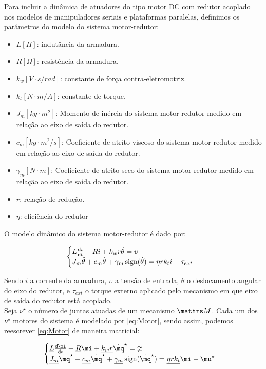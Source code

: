 \documentclass[a4paper,11pt,brazil,fleqn]{article}
\begin{document}
Para incluir a din\^amica de atuadores do tipo motor DC com redutor acoplado nos modelos de manipuladores seriais e plataformas paralelas, definimos os par\^ametros do modelo do sistema motor-redutor:

\begin{itemize}
\item $L [H]$: indut\^ancia da armadura.
\item $R [\Omega]$: resist\^encia da armadura.
\item $k_w [V \cdot s / rad]$: constante de for\c{c}a contra-eletromotriz.
\item $k_t[N \cdot m / A]$: constante de torque.
\item $J_m [kg \cdot m^2]$: Momento de in\'ercia do sistema motor-redutor medido em rela\c{c}\~ao ao eixo de sa\'ida do redutor.
\item $c_m [kg \cdot m^2/s]$: Coeficiente de atrito viscoso do sistema motor-redutor medido em rela\c{c}\~ao ao eixo de sa\'ida do redutor.
\item $\gamma_m [N \cdot m]$: Coeficiente de atrito seco do sistema motor-redutor medido em rela\c{c}\~ao ao eixo de sa\'ida do redutor.
\item $r$: rela\c{c}\~ao de redu\c{c}\~ao.
\item $\eta$: efici\^encia do redutor
\end{itemize}

O modelo din\^amico do sistema motor-redutor \'e dado por:

\begin{equation} \label{eq:Motor}
\begin{cases}
L \frac{\mathsf{d} i}{\mathsf{d} t} + R i + k_w r \dot{\theta} = \upsilon \\
J_m \ddot{\theta} + c_m \dot{\theta} + \gamma_m \operatorname*{sign}(\dot{\theta}) = \eta r k_t i - \tau_{ext}
\end{cases}
\end{equation}

Sendo $i$ a corrente da armadura, $\upsilon$ a tens\~ao de entrada, $\theta$ o deslocamento angular do eixo do redutor, e $\tau_{ext}$ o torque externo aplicado pelo mecanismo em que eixo de sa\'ida do redutor est\'a acoplado. \\

Seja $\nu^\star$ o n\'umero de juntas atuadas de um mecanismo $\ssM$. Cada um dos $\nu^\star$ motores do sistema \'e modelado por \eqref{eq:Motor}, sendo assim, podemos reescrever \eqref{eq:Motor} de maneira matricial:

\begin{equation} \label{eq:MotorMatriz}
\begin{cases}
\underline{L} \frac{\dd \mi}{\dd t} + \underline{R} \mi + \underline{k_w r} \dot{\mq}^\star = \mup  \\
\underline{J_m} \ddot{\mq}^\star + \underline{c_m} \dot{\mq}^\star + \underline{\gamma_m} \sign(\dot{\mq}^\star) = \underline{\eta r k_t} \mi - \mu^\star
\end{cases}
\end{equation}
\end{document}
